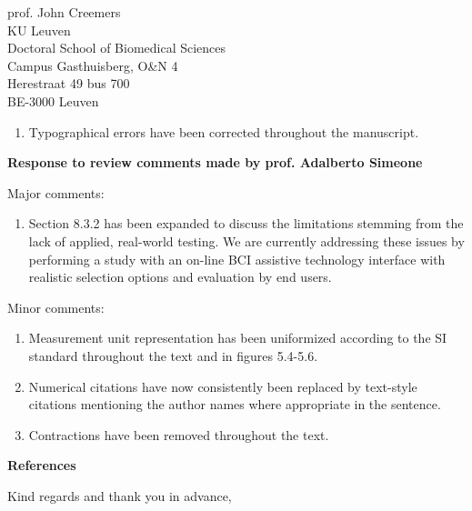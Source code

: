 \documentclass{letter}
\newcommand{\reply}[1]{%
	\textbf{Response to review comments made by prof. #1}

}
\begin{document}
\begin{letter}{%
	prof. John Creemers \\
	KU Leuven \\
	Doctoral School of Biomedical Sciences \\
	Campus Gasthuisberg, O\&N 4 \\
	Herestraat 49 bus 700 \\
	BE-3000 Leuven

}
\begin{enumerate}
	cut-off frequencies for P300 detection and ERP analysis in general,
	these values all fall well within the accepted
	bounds~\cite{Bougrain2012}.
	Decisions to deviate from this were made consciously.
	In chapter 3, filtering between 1 and 24 Hz was applied for consistency
	with the recommended ERP preprocessing pipeline of the MOABB
	benchmarking framework~\cite{Aristimunha2023}.
	This allows for a fair comparison under equal circumstances of the
	performance of the proposed algorithm with performances of other
	algorithms reported by the MOABB benchmarking
	database~\cite{Chevallier2024}.
	In chapter 6, the low-pass frequency was increased from 16 Hz to 20 Hz,
	since the analyses in this explicitly involve the short-time effects of
	latencies of ERP components, and the analysis of faster, early ERP
	components. A low low-pass frequency would harm the precision of
	latency effects in the filtered signal.
	A lower high-pass filter of 0.1 Hz was used here to reveal the
	influence of the proposed alignment approach on potential
	slower late components.
	\item Typographical errors have been corrected throughout the
	manuscript.
\end{enumerate}

\clearpage

\reply{Adalberto Simeone}
Major comments:
\begin{enumerate}
	\item Section 8.3.2 has been expanded to discuss the limitations stemming
    from the lack of applied, real-world testing.
    We are currently addressing these issues by performing a study with an
    on-line BCI assistive technology interface with realistic selection
    options and evaluation by end users.
\end{enumerate}
Minor comments:
\begin{enumerate}
	\item Measurement unit representation has been uniformized according to the
    SI standard throughout the text and in figures 5.4-5.6.
  \item Numerical citations have now consistently been replaced by text-style citations
    mentioning the author names where appropriate in the sentence.
  \item Contractions have been removed throughout the text.
\end{enumerate}


\textbf{References}

\printbibliography[heading=none]

\closing{Kind regards and thank you in advance,}
\end{letter}
\end{document}
